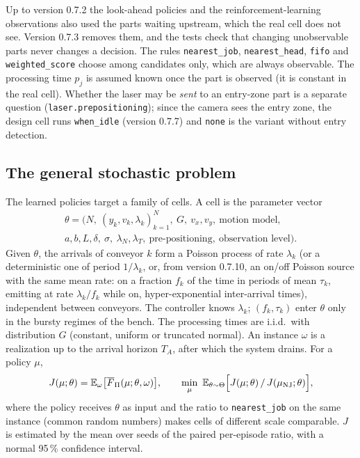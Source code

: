 \documentclass[11pt,a4paper]{article}
\theoremstyle{definition}
\theoremstyle{remark}
\begin{document}
Up to version 0.7.2 the look-ahead policies and the reinforcement-learning observations
also used the parts waiting upstream, which the real cell does not see. Version 0.7.3
removes them, and the tests check that changing unobservable parts never changes a
decision. The rules \texttt{nearest\_job}, \texttt{nearest\_head}, \texttt{fifo} and
\texttt{weighted\_score} choose among candidates only, which are always observable. The
processing time $p_j$ is assumed known once the part is observed (it is constant in the
real cell). Whether the laser may be \emph{sent} to an entry-zone part is a separate
question (\texttt{laser.prepositioning}); since the camera sees the entry zone, the
design cell runs \texttt{when\_idle} (version 0.7.7) and \texttt{none} is the variant
without entry detection.

\subsection{The general stochastic problem}\label{sec:general}
The learned policies target a family of cells. A cell is the parameter vector
\begin{multline*}
\theta=\bigl(N,\ (y_k,v_k,\lambda_k)_{k=1}^N,\ G,\ v_x,v_y,\ \text{motion model},\\
a,b,L,\delta,\ \sigma,\ \lambda_N,\lambda_T,\ \text{pre-positioning},\ \text{observation level}\bigr).
\end{multline*}
Given $\theta$, the arrivals of conveyor $k$ form a Poisson process of rate $\lambda_k$
(or a deterministic one of period $1/\lambda_k$, or, from version 0.7.10, an on/off
Poisson source with the same mean rate: on a fraction $f_k$ of the time in periods of
mean $\tau_k$, emitting at rate $\lambda_k/f_k$ while on, hyper-exponential
inter-arrival times), independent between conveyors. The controller knows $\lambda_k$;
$(f_k,\tau_k)$ enter $\theta$ only in the bursty regimes of the bench. The
processing times are i.i.d.\ with distribution $G$ (constant, uniform or truncated
normal). An instance $\omega$ is a realization up to the arrival horizon $T_A$, after
which the system drains. For a policy $\mu$,
\[
J(\mu;\theta)=\mathbb E_\omega\bigl[\overline F_\Pi(\mu;\theta,\omega)\bigr],\qquad
\min_\mu\ \mathbb E_{\theta\sim\Theta}\Bigl[J(\mu;\theta)\,/\,J(\mu_{\mathrm{NJ}};\theta)\Bigr],
\]
where the policy receives $\theta$ as input and the ratio to \texttt{nearest\_job} on the
same instance (common random numbers) makes cells of different scale comparable.
$J$ is estimated by the mean over seeds of the paired per-episode ratio, with a normal
95\,\% confidence interval.
\end{document}
